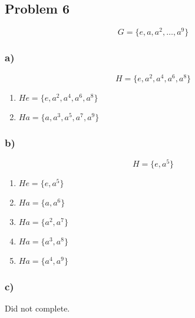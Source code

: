 \documentclass{article}
\begin{document}
    \subsection*{Problem 6}
            \[G = \{e, a, a^2, \dots, a^9\} \]
    \subsubsection*{a)}
            \[H = \{e, a^2, a^4, a^6, a^8\} \]
        \begin{enumerate}
            \item \(He = \{e, a^2, a^4, a^6, a^8\}\)
            \item \(Ha = \{a, a^3, a^5, a^7, a^9\}\)
        \end{enumerate}
    \subsubsection*{b)}
            \[H = \{e, a^5\}\]
        \begin{enumerate}
            \item \(He = \{e, a^5\}\)
            \item \(Ha = \{a, a^6\}\)
            \item \(Ha = \{a^2, a^7\}\)
            \item \(Ha = \{a^3, a^8\}\)
            \item \(Ha = \{a^4, a^9\}\)
        \end{enumerate}
    \subsubsection*{c)}
        Did not complete.

\end{document}
